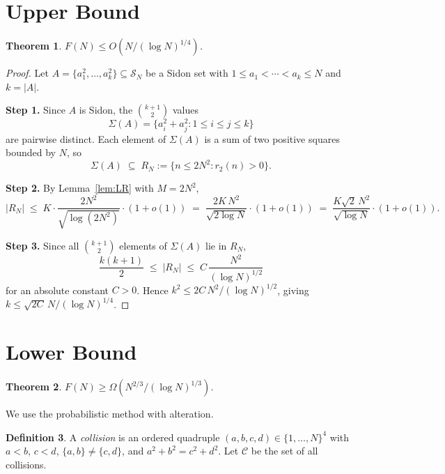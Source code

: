 \documentclass[12pt]{article}
\newtheorem{theorem}{Theorem}[section]
\theoremstyle{definition}
\newtheorem{definition}[theorem]{Definition}
\newcommand{\SN}{\mathcal{S}_N}
\begin{document}
\section{Upper Bound}\label{sec:upper}

\begin{theorem}\label{thm:upper}
$F(N) \le O\!\left(N/(\log N)^{1/4}\right)$.
\end{theorem}

\begin{proof}
Let $A = \{a_1^2,\ldots,a_k^2\} \subseteq \SN$ be a Sidon set with
$1 \le a_1 < \cdots < a_k \le N$ and $k = |A|$.

\medskip
\noindent\textbf{Step 1.}
Since $A$ is Sidon, the $\binom{k+1}{2}$ values
\[
  \Sigma(A) = \bigl\{a_i^2+a_j^2 : 1 \le i \le j \le k\bigr\}
\]
are pairwise distinct.  Each element of $\Sigma(A)$ is a sum of two
positive squares bounded by $N$, so
\[
  \Sigma(A) \;\subseteq\; R_N := \{n \le 2N^2 : r_2(n) > 0\}.
\]

\noindent\textbf{Step 2.}
By Lemma~\ref{lem:LR} with $M = 2N^2$,
\[
  |R_N| \;\le\; K \cdot \frac{2N^2}{\sqrt{\log(2N^2)}} \cdot (1+o(1))
  \;=\; \frac{2K\,N^2}{\sqrt{2\log N}} \cdot (1+o(1))
  \;=\; \frac{K\sqrt{2}\,N^2}{\sqrt{\log N}} \cdot (1+o(1)).
\]

\noindent\textbf{Step 3.}
Since all $\binom{k+1}{2}$ elements of $\Sigma(A)$ lie in $R_N$,
\[
  \frac{k(k+1)}{2} \;\le\; |R_N| \;\le\; C\,\frac{N^2}{(\log N)^{1/2}}
\]
for an absolute constant $C > 0$.  Hence $k^2 \le 2C\,N^2/(\log N)^{1/2}$,
giving $k \le \sqrt{2C}\,N/(\log N)^{1/4}$.
\end{proof}

\section{Lower Bound}\label{sec:lower}

\begin{theorem}\label{thm:lower}
$F(N) \ge \Omega\!\left(N^{2/3}/(\log N)^{1/3}\right)$.
\end{theorem}

We use the probabilistic method with alteration.

\begin{definition}
A \emph{collision} is an ordered quadruple $(a,b,c,d) \in \{1,\ldots,N\}^4$
with $a < b$, $c < d$, $\{a,b\} \ne \{c,d\}$, and $a^2+b^2 = c^2+d^2$.
Let $\mathcal{C}$ be the set of all collisions.
\end{definition}
\end{document}
